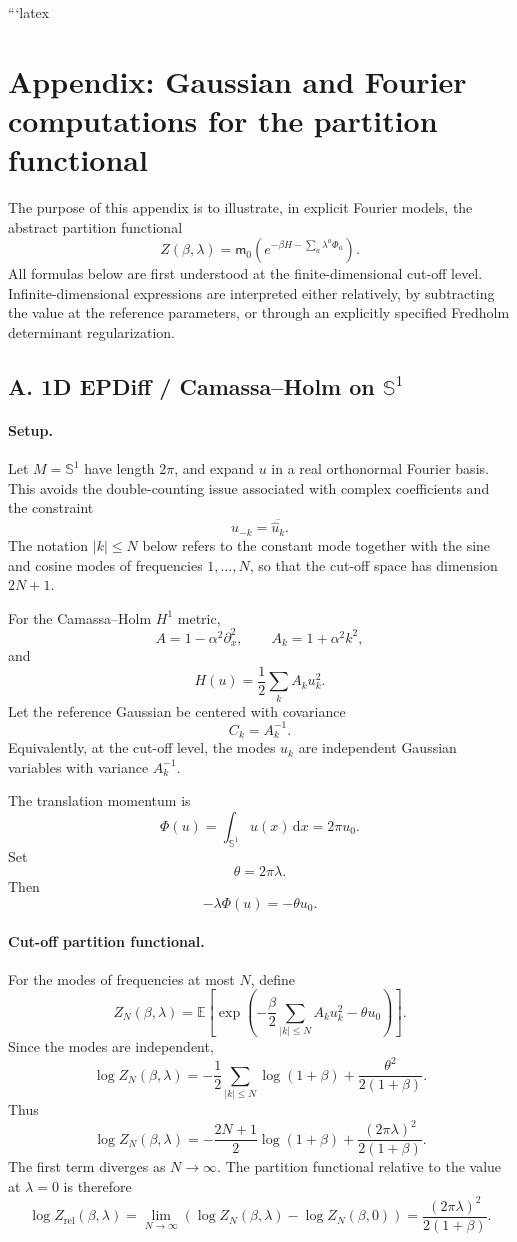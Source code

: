 \documentclass[11pt,reqno]{amsart}
\begin{document}
```latex
\section*{Appendix: Gaussian and Fourier computations for the partition functional}

The purpose of this appendix is to illustrate, in explicit Fourier
models, the abstract partition functional
\[
Z(\beta,\lambda)
=
\mathsf m_0\left(
e^{-\beta H-\sum_a\lambda^a\Phi_a}
\right).
\]
All formulas below are first understood at the finite-dimensional
cut-off level. Infinite-dimensional expressions are interpreted either
relatively, by subtracting the value at the reference parameters, or
through an explicitly specified Fredholm determinant regularization.

\subsection*{A. 1D EPDiff / Camassa--Holm on \(\mathbb S^1\)}

\paragraph{Setup.}
Let $M=\mathbb S^1$ have length $2\pi$, and expand $u$ in a real
orthonormal Fourier basis. This avoids the double-counting issue
associated with complex coefficients and the constraint
\[
\widehat u_{-k}=\overline{\widehat u_k}.
\]
The notation $|k|\leq N$ below refers to the constant mode together with
the sine and cosine modes of frequencies $1,\ldots,N$, so that the
cut-off space has dimension $2N+1$.

For the Camassa--Holm $H^1$ metric,
\[
A=1-\alpha^2\partial_x^2,
\qquad
A_k=1+\alpha^2k^2,
\]
and
\[
H(u)
=
\frac12\sum_k A_k u_k^2.
\]
Let the reference Gaussian be centered with covariance
\[
C_k=A_k^{-1}.
\]
Equivalently, at the cut-off level, the modes $u_k$ are independent
Gaussian variables with variance $A_k^{-1}$.

The translation momentum is
\[
\Phi(u)
=
\int_{\mathbb S^1}u(x)\,\mathrm dx
=
2\pi u_0.
\]
Set
\[
\theta=2\pi\lambda.
\]
Then
\[
-\lambda\Phi(u)=-\theta u_0.
\]

\paragraph{Cut-off partition functional.}
For the modes of frequencies at most $N$, define
\[
Z_N(\beta,\lambda)
=
\mathbb E
\left[
\exp\left(
-\frac{\beta}{2}\sum_{|k|\leq N}A_k u_k^2
-\theta u_0
\right)
\right].
\]
Since the modes are independent,
\[
\log Z_N(\beta,\lambda)
=
-\frac12\sum_{|k|\leq N}\log(1+\beta)
+
\frac{\theta^2}{2(1+\beta)}.
\]
Thus
\[
\boxed{
\log Z_N(\beta,\lambda)
=
-\frac{2N+1}{2}\log(1+\beta)
+
\frac{(2\pi\lambda)^2}{2(1+\beta)}.
}
\]
The first term diverges as $N\to\infty$. The partition functional
relative to the value at $\lambda=0$ is therefore
\[
\log Z_{\mathrm{rel}}(\beta,\lambda)
=
\lim_{N\to\infty}
\left(
\log Z_N(\beta,\lambda)-\log Z_N(\beta,0)
\right)
=
\frac{(2\pi\lambda)^2}{2(1+\beta)}.
\]
\end{document}
